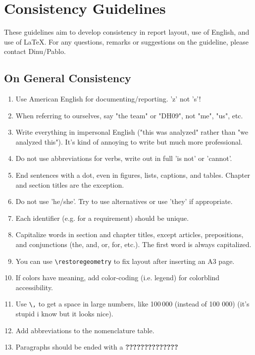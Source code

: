 \chapter*{Consistency Guidelines}
\label{chapter:template-guidelines}
These guidelines aim to develop consistency in report layout, use of English, and use of LaTeX. For any questions, remarks or suggestions on the guideline, please contact Dinu/Pablo.

\section*{On General Consistency}
\label{sec:general-consistency}
\begin{enumerate}[label=G.\arabic*]
    \item Use American English for documenting/reporting. 'z' not 's'!
    \item When referring to ourselves, say "the team" or "DH09", not "me", "us", etc.
    \item Write everything in impersonal English ("this was analyzed" rather than "we analyzed this"). It's kind of annoying to write but much more professional.
    \item Do not use abbreviations for verbs, write out in full 'is not' or 'cannot'.
    \item End sentences with a dot, even in figures, lists, captions, and tables. Chapter and section titles are the exception.
    \item Do not use 'he/she'. Try to use alternatives or use 'they' if appropriate.
    \item Each identifier (e.g. for a requirement) should be unique. %
    \item Capitalize words in section and chapter titles, except articles, prepositions, and conjunctions (the, and, or, for, etc.). The first word is always capitalized.
    \item You can use \verb|\restoregeometry| to fix layout after inserting an A3 page.
    \item If colors have meaning, add color-coding (i.e. legend) for colorblind accessibility.
    \item Use \verb|\,| to get a space in large numbers, like 100\,000 (instead of 100 000) (it's stupid i know but it looks nice).
    \item Add abbreviations to the nomenclature table. 
    \item Paragraphs should be ended with a \textbf{??????????????} 
\end{enumerate}
